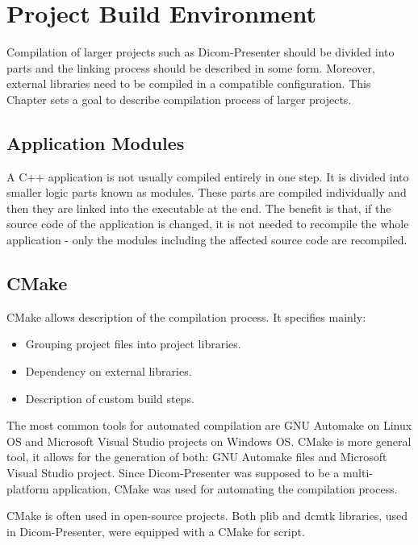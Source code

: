 \chapter{Project Build Environment}
\vspace{-10mm}

Compilation of larger projects such as Dicom-Presenter should be divided into parts and the linking process should be described in some form. Moreover, external libraries need to be compiled in a compatible configuration. This Chapter sets a goal to describe compilation process of larger projects.

\section{Application Modules}

\label{library}

A C++ application is not usually compiled entirely in one step. It is divided into smaller logic parts known as modules. These parts are compiled individually and then they are linked into the executable at the end. The benefit is that, if the source code of the application is changed, it is not needed to recompile the whole application - only the modules including the affected source code are recompiled. 


\section{CMake}

CMake\cite{cmake_home} allows description of the compilation process. It specifies mainly:

\begin{itemize}
\item Grouping project files into project libraries.
\item Dependency on external libraries.
\item Description of custom build steps.
\end{itemize}

The most common tools for automated compilation are GNU Automake on Linux OS and Microsoft Visual Studio projects on Windows OS\cite{msvcompilation}. CMake is more general tool, it allows for the generation of both: GNU Automake files and Microsoft Visual Studio project. Since Dicom-Presenter was supposed to be a multi-platform application, CMake was used for automating the compilation process.

CMake is often used in open-source projects. Both plib and dcmtk libraries, used in Dicom-Presenter, were equipped with a CMake for script.


